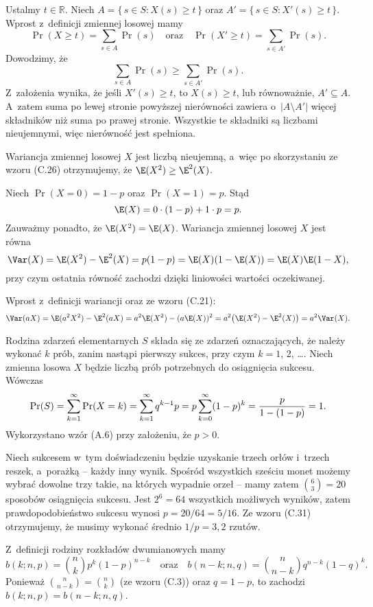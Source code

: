 \exercise %
Ustalmy $t\in\mathbb{R}$.
Niech $A=\{\,s\in S:X(s)\ge t\,\}$ oraz $A'=\{\,s\in S:X'(s)\ge t\,\}$.
Wprost z~definicji zmiennej losowej mamy
\[
	\Pr(X\ge t) = \sum_{s\in A}\Pr(s) \quad\text{oraz}\quad \Pr(X'\ge t) = \sum_{s\in A'}\Pr(s).
\]
Dowodzimy, że
\[
	\sum_{s\in A}\Pr(s) \ge \sum_{s\in A'}\Pr(s).
\]
Z~założenia wynika, że jeśli $X'(s)\ge t$, to $X(s)\ge t$, lub równoważnie, $A'\subseteq A$.
A~zatem suma po lewej stronie powyższej nierówności zawiera o~$|A\setminus A'|$ więcej składników niż suma po prawej stronie.
Wszystkie te składniki są liczbami nieujemnymi, więc nierówność jest spełniona.

\exercise %
Wariancja zmiennej losowej $X$ jest liczbą nieujemną, a~więc po skorzystaniu ze wzoru (C.26) otrzymujemy, że $\E(X^2)\ge\E^2(X)$.

\exercise %
Niech $\Pr(X=0)=1-p$ oraz $\Pr(X=1)=p$.
Stąd
\[
    \E(X)=0\cdot(1-p)+1\cdot p=p.
\]
Zauważmy ponadto, że $\E(X^2)=\E(X)$.
Wariancja zmiennej losowej $X$ jest równa
\[
	\Var(X) = \E(X^2)-\E^2(X) = p(1-p) = \E(X)(1-\E(X)) = \E(X)\E(1-X),
\]
przy czym ostatnia równość zachodzi dzięki liniowości wartości oczekiwanej.

\exercise %
Wprost z~definicji wariancji oraz ze wzoru (C.21):
\[
	\Var(aX) = \E(a^2X^2)-\E^2(aX) = a^2\E(X^2)-(a\E(X))^2 = a^2\bigl(\E(X^2)-\E^2(X)\bigr) = a^2\Var(X).
\]


\exercise %
Rodzina zdarzeń elementarnych $S$ składa się ze zdarzeń oznaczających, że należy wykonać $k$ prób, zanim nastąpi pierwszy sukces, przy czym $k=1$, 2, \dots.
Niech zmienna losowa $X$ będzie liczbą prób potrzebnych do osiągnięcia sukcesu.
Wówczas
\[
	\Pr(S) = \sum_{k=1}^\infty\Pr(X=k) = \sum_{k=1}^\infty q^{k-1}p = p\sum_{k=0}^\infty(1-p)^k = \frac{p}{1-(1-p)} \\[1mm] = 1.
\]
Wykorzystano wzór (A.6) przy założeniu, że $p>0$.

\exercise %
Niech sukcesem w~tym doświadczeniu będzie uzyskanie trzech orłów i~trzech reszek, a~porażką -- każdy inny wynik.
Spośród wszystkich sześciu monet możemy wybrać dowolne trzy takie, na których wypadnie orzeł -- mamy zatem $\binom{6}{3}=20$ sposobów osiągnięcia sukcesu.
Jest $2^6=64$ wszystkich możliwych wyników, zatem prawdopodobieństwo sukcesu wynosi $p=20/64=5/16$.
Ze wzoru (C.31) otrzymujemy, że musimy wykonać średnio $1/p=3{,}2$ rzutów.

\exercise %
Z~definicji rodziny rozkładów dwumianowych mamy
\[
	b(k;n,p) = \binom{n}{k}p^k(1-p)^{n-k} \quad\text{oraz}\quad b(n-k;n,q) = \binom{n}{n-k}q^{n-k}(1-q)^k.
\]
Ponieważ $\binom{n}{n-k}=\binom{n}{k}$ (ze wzoru (C.3)) oraz $q=1-p$, to zachodzi $b(k;n,p)=b(n-k;n,q)$.

